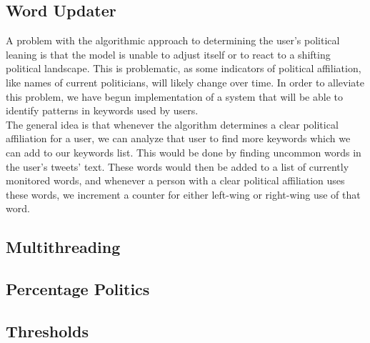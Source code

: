 \subsection{Word Updater}
A problem with the algorithmic approach to determining the user's political
leaning is that the model is unable to adjust itself or to react to a shifting
political landscape. This is problematic, as some indicators of political
affiliation, like names of current politicians, will likely change over time. In
order to alleviate this problem, we have begun implementation of a system that
will be able to identify patterns in keywords used by users.\\ 
The general idea is that whenever the algorithm determines a clear political
affiliation for a user, we can analyze that user to find more keywords which we
can add to our keywords list. This would be done by finding uncommon words in
the user's tweets' text. These words would then be added to a list of currently
monitored words, and whenever a person with a clear political affiliation uses
these words, we increment a counter for either left-wing or right-wing use of
that word. 

% 
% 
% 

\subsection{Multithreading}
\subsection{Percentage Politics}

\subsection{Thresholds}













